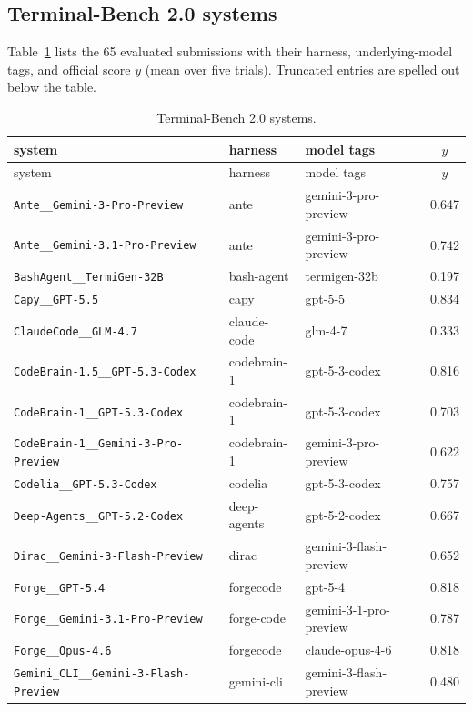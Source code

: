 \documentclass{article}
\begin{document}
\clearpage
\subsection{Terminal-Bench 2.0 systems}
Table~\ref{tab:tb2-systems} lists the 65 evaluated submissions with their harness, underlying-model tags, and official score $y$ (mean over five trials). Truncated entries are spelled out below the table.

\begin{center}\scriptsize
\begin{longtable}{lllc}
\caption{Terminal-Bench 2.0 systems.}\label{tab:tb2-systems}\\
\toprule
system & harness & model tags & $y$ \\
\midrule
\endfirsthead
\toprule
system & harness & model tags & $y$ \\
\midrule
\endhead
\bottomrule
\endlastfoot
\texttt{Ante\_\_Gemini-3-Pro-Preview} & ante & gemini-3-pro-preview & 0.647 \\
\texttt{Ante\_\_Gemini-3.1-Pro-Preview} & ante & gemini-3-pro-preview & 0.742 \\
\texttt{BashAgent\_\_TermiGen-32B} & bash-agent & termigen-32b & 0.197 \\
\texttt{Capy\_\_GPT-5.5} & capy & gpt-5-5 & 0.834 \\
\texttt{ClaudeCode\_\_GLM-4.7} & claude-code & glm-4-7 & 0.333 \\
\texttt{CodeBrain-1.5\_\_GPT-5.3-Codex} & codebrain-1 & gpt-5-3-codex & 0.816 \\
\texttt{CodeBrain-1\_\_GPT-5.3-Codex} & codebrain-1 & gpt-5-3-codex & 0.703 \\
\texttt{CodeBrain-1\_\_Gemini-3-Pro-Preview} & codebrain-1 & gemini-3-pro-preview & 0.622 \\
\texttt{Codelia\_\_GPT-5.3-Codex} & codelia & gpt-5-3-codex & 0.757 \\
\texttt{Deep-Agents\_\_GPT-5.2-Codex} & deep-agents & gpt-5-2-codex & 0.667 \\
\texttt{Dirac\_\_Gemini-3-Flash-Preview} & dirac & gemini-3-flash-preview & 0.652 \\
\texttt{Forge\_\_GPT-5.4} & forgecode & gpt-5-4 & 0.818 \\
\texttt{Forge\_\_Gemini-3.1-Pro-Preview} & forge-code & gemini-3-1-pro-preview & 0.787 \\
\texttt{Forge\_\_Opus-4.6} & forgecode & claude-opus-4-6 & 0.818 \\
\texttt{Gemini\_CLI\_\_Gemini-3-Flash-Preview} & gemini-cli & gemini-3-flash-preview & 0.480 \\

\end{longtable}
\end{center}
\end{document}
